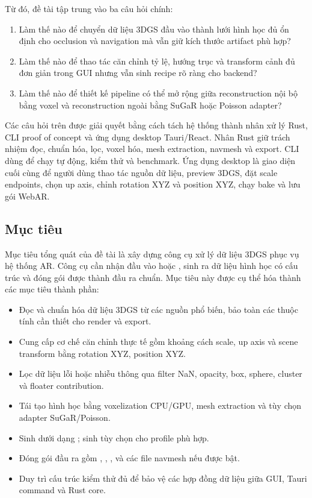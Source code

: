 Từ đó, đề tài tập trung vào ba câu hỏi chính:

\begin{enumerate}
  \item Làm thế nào để chuyển dữ liệu 3DGS đầu vào thành lưới hình học đủ ổn định cho occlusion và navigation mà vẫn giữ kích thước artifact phù hợp?
  \item Làm thế nào để thao tác căn chỉnh tỷ lệ, hướng trục và transform cảnh đủ đơn giản trong GUI nhưng vẫn sinh recipe rõ ràng cho backend?
  \item Làm thế nào để thiết kế pipeline có thể mở rộng giữa reconstruction nội bộ bằng voxel và reconstruction ngoài bằng SuGaR hoặc Poisson adapter?
\end{enumerate}

Các câu hỏi trên được giải quyết bằng cách tách hệ thống thành nhân xử lý Rust, CLI proof of concept và ứng dụng desktop Tauri/React. Nhân Rust giữ trách nhiệm đọc, chuẩn hóa, lọc, voxel hóa, mesh extraction, navmesh và export. CLI dùng để chạy tự động, kiểm thử và benchmark. Ứng dụng desktop là giao diện cuối cùng để người dùng thao tác nguồn dữ liệu, preview 3DGS, đặt scale endpoints, chọn up axis, chỉnh rotation XYZ và position XYZ, chạy bake và lưu gói WebAR.

\subsection{Mục tiêu}

Mục tiêu tổng quát của đề tài là xây dựng công cụ xử lý dữ liệu 3DGS phục vụ hệ thống AR. Công cụ cần nhận đầu vào  hoặc , sinh ra dữ liệu hình học có cấu trúc và đóng gói được thành đầu ra chuẩn. Mục tiêu này được cụ thể hóa thành các mục tiêu thành phần:

\begin{itemize}
  \item Đọc và chuẩn hóa dữ liệu 3DGS từ các nguồn phổ biến, bảo toàn các thuộc tính cần thiết cho render và export.
  \item Cung cấp cơ chế căn chỉnh thực tế gồm khoảng cách scale, up axis và scene transform bằng rotation XYZ, position XYZ.
  \item Lọc dữ liệu lỗi hoặc nhiễu thông qua filter NaN, opacity, box, sphere, cluster và floater contribution.
  \item Tái tạo hình học bằng voxelization CPU/GPU, mesh extraction và tùy chọn adapter SuGaR/Poisson.
  \item Sinh  dưới dạng ; sinh  tùy chọn cho profile phù hợp.
  \item Đóng gói đầu ra gồm , , ,  và các file navmesh nếu được bật.
  \item Duy trì cấu trúc kiểm thử đủ để bảo vệ các hợp đồng dữ liệu giữa GUI, Tauri command và Rust core.
\end{itemize}


